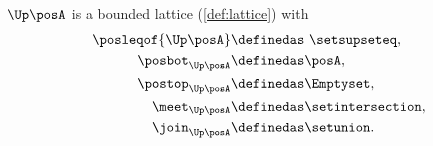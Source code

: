 \begin{lemma}
    \label{lem:u_bounded_lat}
    $\Up \posA$ is a bounded lattice (\cref{def:lattice}) with
    \begin{equation}
        \begin{aligned}
            \posleqof{\Up \posA} & \definedas \ \setsupseteq, \\
            \posbot_{\Up \posA}  & \definedas \posA, \\
            \postop_{\Up \posA}  & \definedas \Emptyset, \\
            \meet_{\Up \posA}    & \definedas \setintersection, \\
            \join_{\Up \posA}    & \definedas \setunion.
        \end{aligned}
    \end{equation}
\end{lemma}
